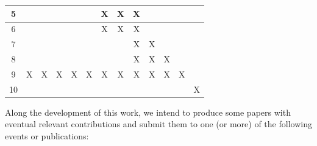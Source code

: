 \documentclass[oneside,12pt]{scrbook}
\theoremstyle{definition}
\theoremstyle{plain}
\theoremstyle{definition}
\begin{document}
\begin{table}[]
\begin{tabular}{c|c|c|c|c|c|c|c|c|c|c|c|c|}
		\multicolumn{1}{|c|}{5}    &                          &                          &                          &                          &                          & X                        & X                        & X                        &                          &                          &                          &                          \\ \hline
		\multicolumn{1}{|c|}{6}    &                          &                          &                          &                          &                          & X                        & X                        & X                        &                          &                          &                          &                          \\ \hline
		\multicolumn{1}{|c|}{7}    &                          &                          &                          &                          &                          &                          &                          & X                        & X                        &                          &                          &                          \\ \hline
		\multicolumn{1}{|c|}{8}    &                          &                          &                          &                          &                          &                          &                          & X                        & X                        & X                        &                          &                          \\ \hline
		\multicolumn{1}{|c|}{9}    & X                        & X                        & X                        & X                        & X                        & X                        & X                        & X                        & X                        & X                        & X                        &                          \\ \hline
		\multicolumn{1}{|c|}{10}   &                          &                          &                          &                          &                          &                          &                          &                          &                          &                          &                          & X                        \\ \hline
	\end{tabular}
\end{table}

Along the development of this work, we intend to produce some papers with eventual relevant contributions and submit them to one (or more) of the following events or publications:
\end{document}
